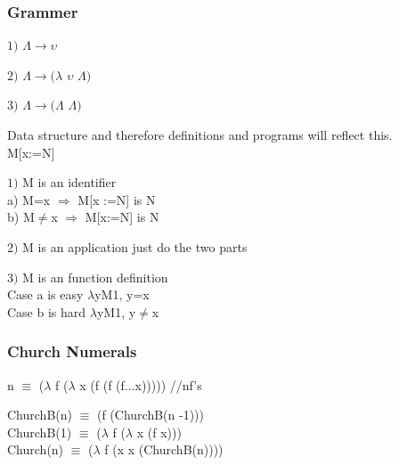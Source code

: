 \documentclass{article}
\begin{document}
\subsubsection*{Grammer}
\begin{flushleft}

$1)$ $\Lambda\rightarrow\upsilon$

$2)$ $\Lambda\rightarrow(\lambda$ 
$\upsilon$
$\Lambda)$

$3)$ $\Lambda\rightarrow(\Lambda$
$\Lambda)$

Data structure and therefore definitions and programs will reflect this.\\
M[x:=N]\\
\end{flushleft}

\begin{flushleft}
$1)$ M is an identifier\\
a) M=x $\Rightarrow$ M[x	:=N] is N\\
b) M$\neq$x $\Rightarrow$ M[x:=N] is N\\
\end{flushleft}

\begin{flushleft}
$2)$ M is an application just do the two parts\\
\end{flushleft}

\begin{flushleft}
$3)$ M is an function definition\\
Case a is easy $\lambda$yM1, y=x\\
Case b is hard $\lambda$yM1, y$\neq$x\\
\end{flushleft}

\subsubsection*{Church Numerals}
\begin{flushleft}
n $\equiv$ ($\lambda$ f ($\lambda$ x (f (f (f...x))))) //nf's
\end{flushleft}

\begin{flushleft}
ChurchB(n) $\equiv$ (f (ChurchB(n -1)))\\
ChurchB(1) $\equiv$ ($\lambda$ f ($\lambda$ x (f x)))\\
Church(n) $\equiv$ ($\lambda$ f (x x (ChurchB(n))))\\
\end{flushleft}
\end{document}
